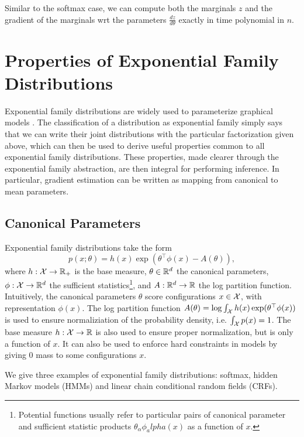 \documentclass[11pt]{article}
\begin{document}
Similar to the softmax case, we can compute both the marginals $z$ and the gradient
of the marginals wrt the parameters $\frac{dz}{d\theta}$ exactly in time polynomial in $n$.






\appendix

\section{Properties of Exponential Family Distributions}
\label{sec:exp-fam}
Exponential family distributions are widely used to parameterize graphical models \citep{vi}.
The classification of a distribution as exponential family simply says that we can write
their joint distributions with the particular factorization given above,
which can then be used to derive useful properties common to all exponential
family distributions.
These properties, made clearer through the exponential family abstraction,
are then integral for performing inference.
In particular, gradient estimation can be written as mapping from
canonical to mean parameters.

\subsection{Canonical Parameters}
Exponential family distributions take the form
\begin{equation}
    \label{eqn:exp-canon}
    p(x;\theta) = h(x)\exp(\theta^\top \phi(x)-A(\theta)),
\end{equation}
where $h:\mathcal{X}\to\mathbb{R}_+$ is the base measure,
$\theta\in\mathbb{R}^d$ the canonical parameters,
$\phi:\mathcal{X}\to\mathbb{R}^d$ the sufficient statistics\footnote{Potential functions usually refer to
particular pairs of canonical parameter and sufficient statistic products
$\theta_\alpha\phi_alpha(x)$ as a function of $x$.},
and $A:\mathbb{R}^d\to\mathbb{R}$ the log partition function.
Intuitively, the canonical parameters $\theta$ score configurations $x\in\mathcal{X}$,
with representation $\phi(x)$.
The log partition function $A(\theta) = \log\int_{\mathcal{X}}h(x)\exp(\theta^\top\phi(x))$
is used to ensure normaliziation of the probability density,
i.e. $\int_{\mathcal{X}}p(x) = 1$.
The base measure $h:\mathcal{X}\to\mathbb{R}$ is also used to ensure proper normalization,
but is only a function of $x$.
It can also be used to enforce hard constraints in models by giving
0 mass to some configurations $x$.

We give three examples of exponential family distributions:
softmax, hidden Markov models (HMMs)
and linear chain conditional random fields (CRFs).
\end{document}
